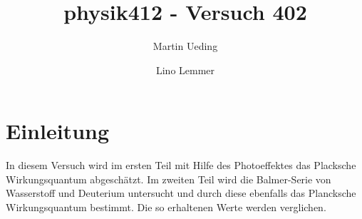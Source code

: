 

\title{physik412 - Versuch 402}
\author{Martin Ueding\and Lino Lemmer}


\maketitle
\section{Einleitung}
\label{sec:Einleitung}

In diesem Versuch wird im ersten Teil mit Hilfe des Photoeffektes das Placksche Wirkungsquantum abgeschätzt. Im zweiten Teil wird die Balmer-Serie von Wasserstoff und Deuterium untersucht und durch diese ebenfalls das Plancksche Wirkungsquantum bestimmt. Die so erhaltenen Werte werden verglichen.


